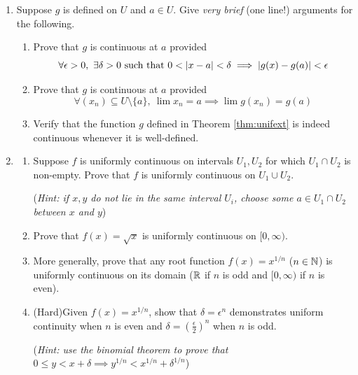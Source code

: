 \begin{exercises}{}{}
\begin{enumerate}
  





		\item Suppose $g$ is defined on $U$ and $a\in U$. Give \emph{very brief} (one line!) arguments for the following.
		\begin{enumerate}
		  \item Prove that $g$ is continuous at $a$ provided
		  \[
		  	\forall \epsilon>0,\ \exists \delta>0
		  	\text{ such that }
		  	0<\left| x-a\right|<\delta\implies\left| g(x)-g(a)\right|<\epsilon
		  \]
		  
		  \item Prove that $g$ is continuous at $a$ provided
		  \[
		  	\forall (x_n)\subseteq U\setminus\{a\},\ \lim x_n=a\implies \lim g(x_n)=g(a)
		  \]
		  
		  \item Verify that the function $g$ defined in Theorem \ref{thm:unifext} is indeed continuous whenever it is well-defined.
		\end{enumerate}


	  \item\label{exs:unifcontunion}\begin{enumerate}
	    \item Suppose $f$ is uniformly continuous on intervals $U_1,U_2$ for which $U_1\cap U_2$ is non-empty. Prove that $f$ is uniformly continuous on $U_1\cup U_2$.\par
	    (\emph{Hint: if $x,y$ do not lie in the same interval $U_i$, choose some $a\in U_1\cap U_2$ between $x$ and $y$})
	
			\item Prove that $f(x)=\sqrt x$ is uniformly continuous on $[0,\infty)$.
			
			\item More generally, prove that any root function $f(x)=x^{1/n}$ ($n\in\mathbb{N}$) is uniformly continuous on its domain ($\mathbb{R}$ if $n$ is odd and $[0,\infty)$ if $n$ is even).
			
			\item (Hard)\lstsp Given $f(x)=x^{1/n}$, show that $\delta=\epsilon^n$ demonstrates uniform continuity when $n$ is even and $\delta=\left(\frac\epsilon 2\right)^n$ when $n$ is odd.\par
			(\emph{Hint: use the binomial theorem to prove that $0\le y<x+\delta\implies y^{1/n}<x^{1/n}+\delta^{1/n}$})
		\end{enumerate}
	
	\end{enumerate}
\end{exercises}

\vspace{-15pt}

